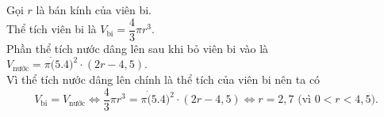 \begin{bt}
{\begin{center}
		\end{center}
		Gọi $r$ là bán kính của viên bi.\\
		Thể tích viên bi là $V_{\textrm{bi}} = \dfrac{4}{3}\pi r^3$.\\
		Phần thể tích nước dâng lên sau khi bỏ viên bi vào là $V_{\textrm{nước}} = \pi\dot (5.4)^2\cdot (2r - 4{,}5)$.\\
		Vì thể tích nước dâng lên chính là thể tích của viên bi nên ta có 
		$$V_{\textrm{bi}} = V_{\textrm{nước}} \Leftrightarrow \dfrac{4}{3}\pi r^3 = \pi\dot (5.4)^2\cdot (2r - 4{,}5) \Leftrightarrow r = 2{,}7 \textrm{ (vì $0 < r < 4{,}5$).} $$
	}
\end{bt}

